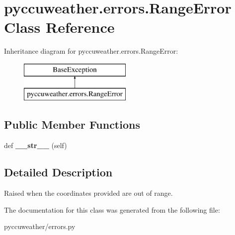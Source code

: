 \hypertarget{classpyccuweather_1_1errors_1_1_range_error}{}\section{pyccuweather.\+errors.\+Range\+Error Class Reference}
\label{classpyccuweather_1_1errors_1_1_range_error}
Inheritance diagram for pyccuweather.\+errors.\+Range\+Error\+:\begin{figure}[H]
\begin{center}
\leavevmode
\includegraphics[height=2.000000cm]{classpyccuweather_1_1errors_1_1_range_error}
\end{center}
\end{figure}
\subsection*{Public Member Functions}
\begin{DoxyCompactItemize}
\item 
\hypertarget{classpyccuweather_1_1errors_1_1_range_error_ad82eb8a20cdd96338a8f0cf4263439da}{}def {\bfseries \+\_\+\+\_\+str\+\_\+\+\_\+} (self)\label{classpyccuweather_1_1errors_1_1_range_error_ad82eb8a20cdd96338a8f0cf4263439da}

\end{DoxyCompactItemize}


\subsection{Detailed Description}
\begin{DoxyVerb}Raised when the coordinates provided are out of range.
\end{DoxyVerb}
 

The documentation for this class was generated from the following file\+:\begin{DoxyCompactItemize}
\item 
pyccuweather/errors.\+py\end{DoxyCompactItemize}
